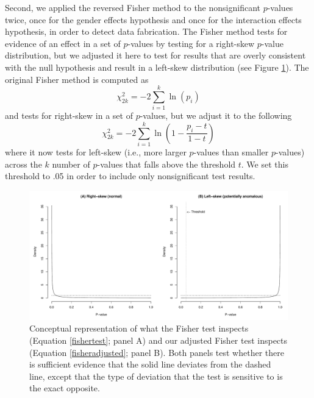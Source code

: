 \documentclass{article}
\begin{document}
Second, we applied the reversed Fisher method to the nonsignificant $p$-values twice, once for the gender effects hypothesis and once for the interaction effects hypothesis, in order to detect data fabrication. The Fisher method \citep{fisher1925} tests for evidence of an effect in a set of $p$-values by testing for a right-skew $p$-value distribution, but we adjusted it here to test for results that are overly consistent with the null hypothesis and result in a left-skew distribution (see Figure \ref{leftskew}). The original Fisher method is computed as
\begin{equation}
\chi^2_{2k}=-2\sum\limits^k_{i=1}\ln(p_i)
\label{fisher}
\end{equation}
and tests for right-skew in a set of $p$-values, but we adjust it to the following
\begin{equation}
\chi^2_{2k}=-2\sum\limits^k_{i=1}\ln(1-\frac{p_i-t}{1-t})
\label{fisheradjusted}
\end{equation}
where it now tests for left-skew (i.e., more larger $p$-values than smaller $p$-values) across the $k$ number of $p$-values that falls above the threshold $t$. We set this threshold to .05 in order to include only nonsignificant test results.


\begin{figure}[!ht]
\begin{center}
\includegraphics[width=\textwidth,height=\textheight,keepaspectratio]{../figures/fisherfig.pdf}
\caption{Conceptual representation of what the Fisher test inspects (Equation \ref{fishertest}; panel A) and our adjusted Fisher test inspects (Equation \ref{fisheradjusted}; panel B). Both panels test whether there is sufficient evidence that the solid line deviates from the dashed line, except that the type of deviation that the test is sensitive to is the exact opposite.}
\label{leftskew}
\end{center}
\end{figure}
\end{document}
